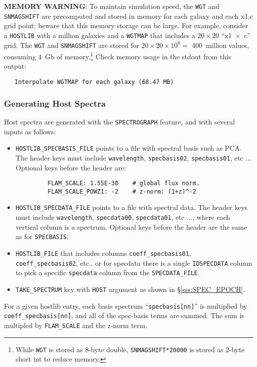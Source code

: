 \documentclass[12pt]{article}
\begin{document}
{{\bf MEMORY WARNING}: 
To maintain simulation speed, the {\tt WGT} and {\tt SNMAGSHIFT} are 
precomputed and stored in memory for each galaxy and each x1,c grid point;
beware that this memory storage can be large.
For example, consider a {\tt HOSTLIB} with a million galaxies and
a {\tt WGTMAP} that includes a $20\times 20$ ``x1~$\times$~c'' grid. 
The {\tt WGT} and {\tt SNMAGSHIFT} are stored for $20\times 20\times 10^6 = $
400~million values, consuming 4~Gb of memory.\footnote{While {\tt WGT}
  is stored as 8-byte double, {\tt SNMAGSHIFT*20000} is stored as
  2-byte short int to reduce memory.}
%
Check memory usage in the stdout from this output:
\begin{verbatim}
   Interpolate WGTMAP for each galaxy (68.47 MB)
\end{verbatim}


\newcommand{\Rhalf}{R_{1/2}}
\newcommand{\Sn}{{\cal S}_{n}}

\subsubsection{Generating Host Spectra}
\label{sss:hostlib_spectra}

Host spectra are generated with the {\tt SPECTROGRAPH} feature,
and with several inputs as follows:
\begin{itemize}
  \item {\tt HOSTLIB\_SPECBASIS\_FILE} points to a file with spectral basis
         such as PCA. The header keys must include {\tt wavelength}, 
         {\tt specbasis02}, {\tt specbasis01}, etc ...
         Optional keys before the header are:
          \vspace{-0.5cm}
     \begin{verbatim}
         FLAM_SCALE: 1.55E-30    # global flux norm.
         FLAM_SCALE_POWZ1: -2    # z-norm: (1+z)^-2
     \end{verbatim}  \vspace{-1.0cm}
%
  \item {\tt HOSTLIB\_SPECDATA\_FILE} points to a file with spectral data.
         The header keys must include {\tt wavelength}, 
         {\tt specdata00}, {\tt specdata01}, etc ..., where each 
         vertical column is a spectrum.
         Optional keys before the header are the same as for {\tt SPECBASIS}.
%
  \item {\tt HOSTLIB\_FILE} that includes columns 
          {\tt coeff\_specbasis01}, {\tt coeff\_specbasis02}, etc..
          or for specdata there is a single {\tt IDSPECDATA} column
          to pick a specific {\tt specdata} column from the
          {\tt SPECDATA\_FILE}.
  \item {\tt TAKE\_SPECTRUM} key with {\tt HOST} argument as shown in 
           \S\ref{sss:SPEC_EPOCH}.
\end{itemize}
%
For a given hostlib entry, each basis spectrum ``{\tt specbasis[nn]}''
is multiplied by {\tt coeff\_specbasis[nn]}, and all of the spec-basis
terms are summed. The sum is multipled by {\tt FLAM\_SCALE} and
the z-norm term. 


}
\end{document}
